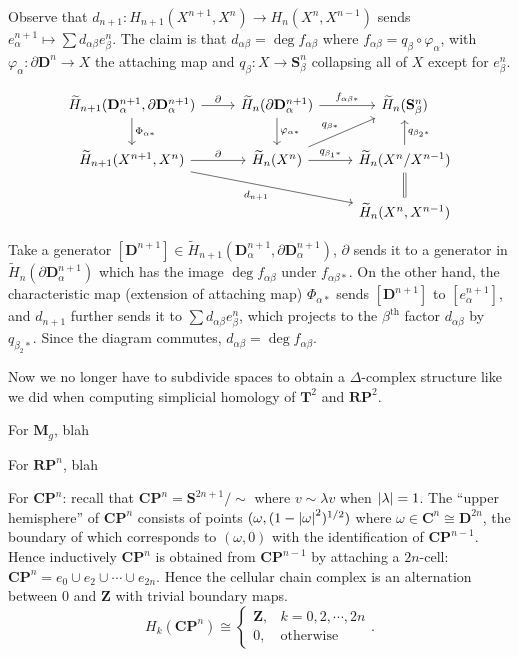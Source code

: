 \documentclass[11pt]{article}
\theoremstyle{definition}
\theoremstyle{plain}
\theoremstyle{remark}
\newcommand{\Z}{\mathbf{Z}}
\begin{document}
Observe that $d_{n+1}:H_{n+1}(X^{n+1},X^n)\to H_n(X^n,X^{n-1})$ sends $e_\alpha^{n+1}\mapsto\sum d_{\alpha\beta}e^n_\beta$. The claim is that $d_{\alpha\beta}=\deg f_{\alpha\beta}$ where $f_{\alpha\beta}=q_\beta\circ\varphi_\alpha$, with $\varphi_\alpha:\partial\mathbf{D}^n\to X$ the attaching map and $q_\beta:X\to\mathbf{S}^n_\beta$ collapsing all of $X$ except for $e_\beta^n$.

\[\begin{tikzcd}
\widetilde{H}_{n+1}(\mathbf{D}_\alpha^{n+1},\partial\mathbf{D}^{n+1}_\alpha)\arrow{d}{\Phi_{\alpha\ast}}\arrow{r}{\partial}&\widetilde{H}_n(\partial\mathbf{D}_\alpha^{n+1})\arrow{d}{\varphi_{\alpha\ast}}\arrow{r}{f_{\alpha\beta\ast}}&\widetilde{H}_n(\mathbf{S}_\beta^n)\\
\widetilde{H}_{n+1}(X^{n+1},X^n)\arrow[swap]{drr}{d_{n+1}}\arrow{r}{\partial}&\widetilde{H}_n(X^n)\arrow{ur}{q_{\beta\ast}}\arrow{r}{q_{\beta_1\ast}}&\widetilde{H}_n(X^n/X^{n-1})\arrow[swap]{u}{q_{\beta_2\ast}}\\
&&\widetilde{H}_n(X^n,X^{n-1})\arrow[equal]{u}
\end{tikzcd}\]

Take a generator $[\mathbf{D}^{n+1}]\in\widetilde{H}_{n+1}(\mathbf{D}_\alpha^{n+1},\partial\mathbf{D}^{n+1}_\alpha)$, $\partial$ sends it to a generator in $\widetilde{H}_n(\partial\mathbf{D}_\alpha^{n+1})$ which has the image $\deg f_{\alpha\beta}$ under $f_{\alpha\beta\ast}$. On the other hand, the characteristic map (extension of attaching map) $\Phi_{\alpha\ast}$ sends $[\mathbf{D}^{n+1}]$ to $[e_\alpha^{n+1}]$, and $d_{n+1}$ further sends it to $\sum d_{\alpha\beta}e_\beta^n$, which projects to the $\beta^{\mathrm{th}}$ factor $d_{\alpha\beta}$ by $q_{\beta_2\ast}$. Since the diagram commutes, $d_{\alpha\beta}=\deg f_{\alpha\beta}$.\medbreak

Now we no longer have to subdivide spaces to obtain a $\Delta$-complex structure like we did when computing simplicial homology of $\mathbf{T}^2$ and $\mathbf{RP}^2$.\medbreak

For $\mathbf{M}_g$, blah\medbreak

For $\mathbf{RP}^n$, blah\medbreak

For $\mathbf{CP}^n$: recall that $\mathbf{CP}^n=\mathbf{S}^{2n+1}/\sim$ where $v\sim\lambda v$ when $\abs{\lambda}=1$. The ``upper hemisphere'' of $\mathbf{CP}^n$ consists of points $(\omega,(1-\abs{\omega}^2)^{1/2})$ where $\omega\in\mathbf{C}^n\cong\mathbf{D}^{2n}$, the boundary of which corresponds to $(\omega,0)$ with the identification of $\mathbf{CP}^{n-1}$. Hence inductively $\mathbf{CP}^n$ is obtained from $\mathbf{CP}^{n-1}$ by attaching a $2n$-cell: $\mathbf{CP}^n=e_0\cup e_2\cup\cdots\cup e_{2n}$. Hence the cellular chain complex is an alternation between $0$ and $\Z$ with trivial boundary maps.
\[H_k(\mathbf{CP}^n)\cong\begin{cases}
\Z,&k=0,2,\cdots,2n\\0,&\textrm{otherwise}
\end{cases}.\]
\end{document}
